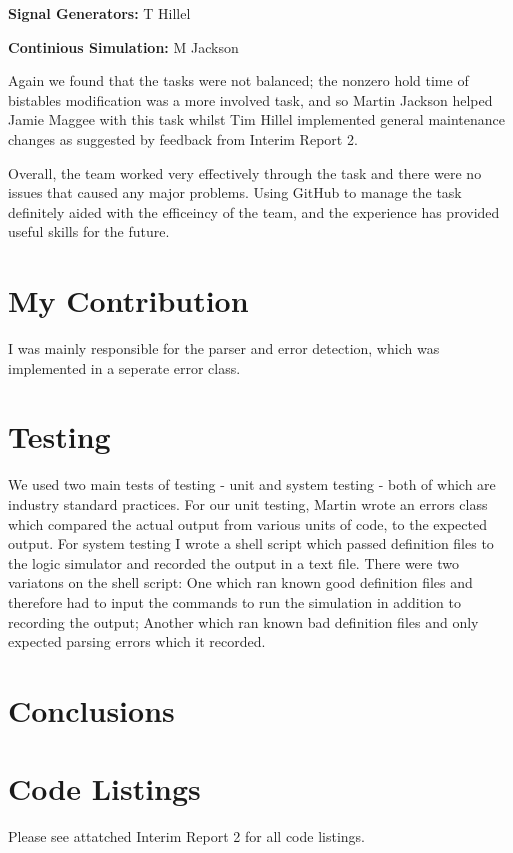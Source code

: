 \documentclass[a4paper,10pt]{article}
\begin{document}
\textbf{Signal Generators:} T Hillel

\textbf{Continious Simulation:} M Jackson

Again we found that the tasks were not balanced; the nonzero hold time of bistables modification was a more involved task, and so Martin Jackson helped Jamie Maggee with this task whilst Tim Hillel implemented general maintenance changes as suggested by feedback from Interim Report 2.

Overall, the team worked very effectively through the task and there were no issues that caused any major problems. Using GitHub to manage the task definitely aided with the efficeincy of the team, and the experience has provided useful skills for the future.

\section{My Contribution}

I was mainly responsible for the parser and error detection, which was implemented in a seperate error class. 

\section{Testing}

We used two main tests of testing - unit and system testing - both of which are industry standard practices. For our unit testing, Martin wrote an errors class which compared the actual output from various units of code, to the expected output. For system testing I wrote a shell script which passed definition files to the logic simulator and recorded the output in a text file. There were two variatons on the shell script: One which ran known good definition files and therefore had to input the commands to run the simulation in addition to recording the output; Another which ran known bad definition files and only expected parsing errors which it recorded.

\section{Conclusions}

\pagebreak

\appendix
\section{Code Listings}
Please see attatched Interim Report 2 for all code listings.
\end{document}
